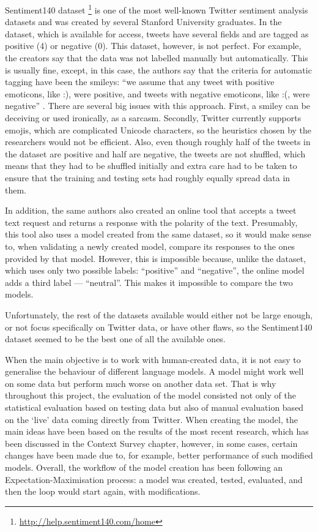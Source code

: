 Sentiment140 dataset \footnote{\url{http://help.sentiment140.com/home}} is one of the most well-known Twitter sentiment analysis datasets and was created by several Stanford University graduates. In the dataset, which is available for access, tweets have several fields and are tagged as positive (4) or negative (0). This dataset, however, is not perfect. For example, the creators say that the data was not labelled manually but automatically. This is usually fine, except, in this case, the authors say that the criteria for automatic tagging have been the smileys: ``we assume that any tweet with positive emoticons, like :), were positive, and tweets with negative emoticons, like :(, were negative'' \cite{sentiment140}. There are several big issues with this approach. First, a smiley can be deceiving or used ironically, as a sarcasm. Secondly, Twitter currently supports emojis, which are complicated Unicode characters, so the heuristics chosen by the researchers would not be efficient. Also, even though roughly half of the tweets in the dataset are positive and half are negative, the tweets are not shuffled, which means that they had to be shuffled initially and extra care had to be taken to ensure that the training and testing sets had roughly equally spread data in them.

In addition, the same authors also created an online tool that accepts a tweet text request and returns a response with the polarity of the text. Presumably, this tool also uses a model created from the same dataset, so it would make sense to, when validating a newly created model, compare its responses to the ones provided by that model. However, this is impossible because, unlike the dataset, which uses only two possible labels: ``positive'' and ``negative'', the online model adds a third label --- ``neutral''. This makes it impossible to compare the two models. 

Unfortunately, the rest of the datasets available would either not be large enough, or not focus specifically on Twitter data, or have other flaws, so the Sentiment140 dataset seemed to be the best one of all the available ones. 

When the main objective is to work with human-created data, it is not easy to generalise the behaviour of different language models. A model might work well on some data but perform much worse on another data set. That is why throughout this project, the evaluation of the model consisted not only of the statistical evaluation based on testing data but also of manual evaluation based on the `live' data coming directly from Twitter. When creating the model, the main ideas have been based on the results of the most recent research, which has been discussed in the Context Survey chapter, however, in some cases, certain changes have been made due to, for example, better performance of such modified models. Overall, the workflow of the model creation has been following an Expectation-Maximisation process: a model was created, tested, evaluated, and then the loop would start again, with modifications.

